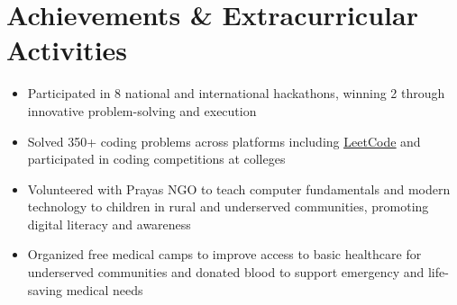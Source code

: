 \documentclass[letterpaper,11pt]{article}
\newcommand{\resumeItem}[1]{
  \item\small{
    {#1 \vspace{-2pt}}
  }
}
\newcommand{\resumeItemListStart}{\begin{itemize}}
\newcommand{\resumeItemListEnd}{\end{itemize}\vspace{-8pt}}
\begin{document}
\section{Achievements \& Extracurricular Activities}
\resumeItemListStart
    \resumeItem{Participated in 8 national and international hackathons, winning 2 through innovative problem-solving and execution}
    \resumeItem{Solved 350+ coding problems across platforms including \href{https://leetcode.com/u/saadziaatharkhan/}{\underline{LeetCode}} and participated in coding competitions at colleges}
    \resumeItem{Volunteered with Prayas NGO to teach computer fundamentals and modern technology to children in rural and underserved communities, promoting digital literacy and awareness}
    \resumeItem{Organized free medical camps to improve access to basic healthcare for underserved communities and donated blood to support emergency and life-saving medical needs}
\resumeItemListEnd


\end{document}
